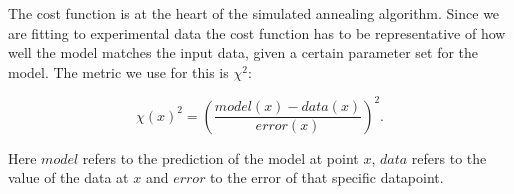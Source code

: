 The cost function is at the heart of the simulated annealing algorithm. Since we are fitting to experimental data the cost function has to be representative of how well the model matches the input data, given a certain parameter set for the model. The metric we use for this is $\chi^2$:

\begin{equation}
\chi (x)^2 = \left( \frac{model(x)-data(x)}{error(x)} \right)^2.
\end{equation}

Here $model$ refers to the prediction of the model at point $x$, $data$ refers to the value of the data at $x$ and $error$ to the error of that specific datapoint. 
